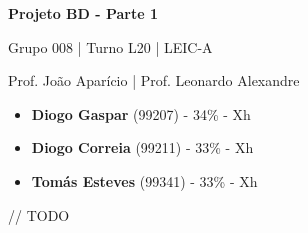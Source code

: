 \documentclass[12pt,a4paper]{article}
\begin{document}
  \begin{titlepage}
    \begin{center}
      \vspace*{5cm}
    
      \Huge
      \textbf{Projeto BD - Parte 1}

      \vspace{0.5cm}
      \LARGE
      Grupo 008 | Turno L20 | LEIC-A

      \vspace{0.5cm}
      \large
      Prof. João Aparício | Prof. Leonardo Alexandre

      \vfill
    \end{center}
    \large
    \begin{itemize}
      \item[] \textbf{Diogo Gaspar} (99207) - 34\% - Xh
      \item[] \textbf{Diogo Correia} (99211) - 33\% - Xh
      \item[] \textbf{Tomás Esteves} (99341) - 33\% - Xh
    \end{itemize}
  \end{titlepage}

  \begin{landscape}
    
  \end{landscape}

  // TODO
\end{document}
